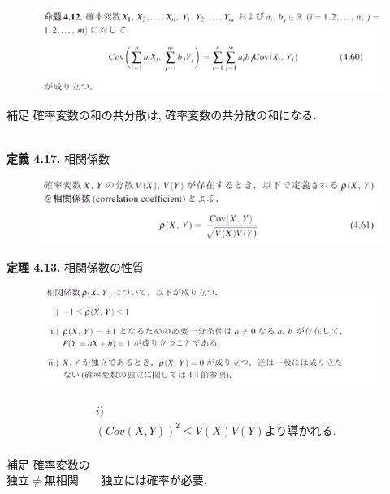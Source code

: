 \documentclass[dvipdfmx,10pt, a4j]{jarticle}
\theoremstyle{definition}
\begin{document}
\noindent
\begin{figure}[htbp]
\includegraphics[width=\linewidth]{D_11/meidai/4_12.png}
\end{figure}
\begin{itembox}[l]{補足}
  確率変数の和の共分散は, 確率変数の共分散の和になる.
\end{itembox}\\

\noindent
\textbf{定義 4.17.} 相関係数\\
\begin{figure}[htbp]
\includegraphics[width=\linewidth]{D_11/teigi/4_17.png}
\end{figure}

\noindent
\textbf{定理 4.13.} 相関係数の性質\\
\begin{figure}[htbp]
\includegraphics[width=\linewidth]{D_11/teiri/4_13.png}
\end{figure}
\begin{align*}
  &i)\\
  &(Cov(X, Y))^2 \leq V(X)V(Y) より導かれる.\\
\end{align*}
\begin{itembox}[l]{補足}
  確率変数の\\
  $独立 \neq 無相関 \qquad 独立には確率が必要.$\\
\end{itembox}\\
\end{document}
